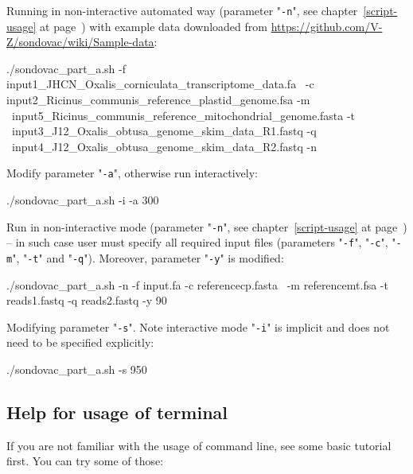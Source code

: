 \documentclass[a4paper, 11pt, twoside]{article}
\begin{document}
Running in non-interactive automated way (parameter "\texttt{-n}", see chapter~\ref{script-usage} at page~\pageref{script-usage}) with 
example data downloaded from \href{https://github.com/V-Z/sondovac/wiki/Sample-data}{https://github.com/V-Z/sondovac/wiki/Sample-data}:

\begin{bashcode}
  ./sondovac_part_a.sh -f input1_JHCN_Oxalis_corniculata_transcriptome_data.fa \
   -c input2_Ricinus_communis_reference_plastid_genome.fsa -m \
   input5_Ricinus_communis_reference_mitochondrial_genome.fasta -t \
   input3_J12_Oxalis_obtusa_genome_skim_data_R1.fastq -q \
   input4_J12_Oxalis_obtusa_genome_skim_data_R2.fastq -n
\end{bashcode}

Modify parameter "\texttt{-a}", otherwise run interactively:

\begin{bashcode}
  ./sondovac_part_a.sh -i -a 300
\end{bashcode}

Run in non-interactive mode (parameter "\texttt{-n}", see chapter~\ref{script-usage} at page~\pageref{script-usage}) -- in such case user must specify all required input files (parameters "\texttt{-f}", "\texttt{-c}", "\texttt{-m}", "\texttt{-t}" and "\texttt{-q}"). Moreover, parameter "\texttt{-y}" is modified:

\begin{bashcode}
  ./sondovac_part_a.sh -n -f input.fa -c referencecp.fasta \
   -m referencemt.fsa -t reads1.fastq -q reads2.fastq -y 90
\end{bashcode}

Modifying parameter "\texttt{-s}". Note interactive mode "\texttt{-i}" is implicit and does not need to be specified explicitly:

\begin{bashcode}
  ./sondovac_part_a.sh -s 950
\end{bashcode}

\subsection{Help for usage of terminal}

If you are not familiar with the usage of command line, see some basic tutorial first. You can try some of those:
\end{document}
